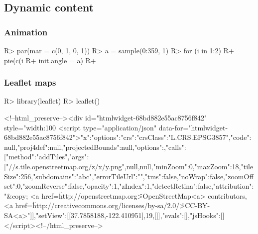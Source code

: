 \documentclass[
]{jss}
\begin{document}
\hypertarget{dynamic-content}{%
\subsection{Dynamic content}\label{dynamic-content}}

\hypertarget{animation}{%
\subsubsection{Animation}\label{animation}}

\begin{CodeChunk}

\begin{CodeInput}
R> par(mar = c(0, 1, 0, 1))
R> a = sample(0:359, 1)
R> for (i in 1:2) {
R+   pie(c(i %
R+       init.angle = a)
R+ }
\end{CodeInput}


\begin{center}\end{center}

\end{CodeChunk}

\hypertarget{leaflet-maps}{%
\subsubsection{Leaflet maps}\label{leaflet-maps}}

\begin{CodeChunk}

\begin{CodeInput}
R> library(leaflet)
R> leaflet() %
\end{CodeInput}
<!--html_preserve--><div id="htmlwidget-68bd882e55ac8756f842" style="width:100%
<script type="application/json" data-for="htmlwidget-68bd882e55ac8756f842">{"x":{"options":{"crs":{"crsClass":"L.CRS.EPSG3857","code":null,"proj4def":null,"projectedBounds":null,"options":{}}},"calls":[{"method":"addTiles","args":["//{s}.tile.openstreetmap.org/{z}/{x}/{y}.png",null,null,{"minZoom":0,"maxZoom":18,"tileSize":256,"subdomains":"abc","errorTileUrl":"","tms":false,"noWrap":false,"zoomOffset":0,"zoomReverse":false,"opacity":1,"zIndex":1,"detectRetina":false,"attribution":"&copy; <a href=\"http://openstreetmap.org\">OpenStreetMap<\/a> contributors, <a href=\"http://creativecommons.org/licenses/by-sa/2.0/\">CC-BY-SA<\/a>"}]}],"setView":[[37.7858188,-122.410951],19,[]]},"evals":[],"jsHooks":[]}</script><!--/html_preserve-->\end{CodeChunk}
\end{document}
